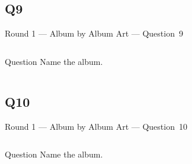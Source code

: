 \documentclass[11pt]{beamer}
\begin{document}
\subsection*{Q9}
\begin{frame}[t]{Round 1 --- Album by Album Art --- \mbox{Question 9}}
\begin{columns}[T,totalwidth=\linewidth]
\begin{column}{0.32\linewidth}
\begin{block}{Question}
Name the album.
\end{block}
\end{column}
\begin{column}{0.65\linewidth}
\begin{center}
\texttt{[image: \{Images/remaininlight]}.jpeg}
\end{center}
\end{column}
\end{columns}
\end{frame}
\subsection*{Q10}
\begin{frame}[t]{Round 1 --- Album by Album Art --- \mbox{Question 10}}
\begin{columns}[T,totalwidth=\linewidth]
\begin{column}{0.32\linewidth}
\begin{block}{Question}
Name the album.
\end{block}
\end{column}
\begin{column}{0.65\linewidth}
\begin{center}
\texttt{[image: \{Images/bookends]}.jpeg}
\end{center}
\end{column}
\end{columns}
\end{frame}
\end{document}
